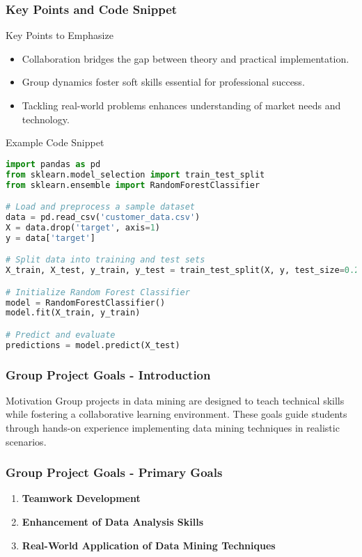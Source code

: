 \documentclass[aspectratio=169]{beamer}
\begin{document}
\begin{frame}[fragile]
    \frametitle{Key Points and Code Snippet}
    \begin{block}{Key Points to Emphasize}
        \begin{itemize}
            \item Collaboration bridges the gap between theory and practical implementation.
            \item Group dynamics foster soft skills essential for professional success.
            \item Tackling real-world problems enhances understanding of market needs and technology.
        \end{itemize}
    \end{block}
    
    \begin{block}{Example Code Snippet}
    \begin{lstlisting}[language=Python]
import pandas as pd
from sklearn.model_selection import train_test_split
from sklearn.ensemble import RandomForestClassifier

# Load and preprocess a sample dataset
data = pd.read_csv('customer_data.csv')  
X = data.drop('target', axis=1)
y = data['target']

# Split data into training and test sets
X_train, X_test, y_train, y_test = train_test_split(X, y, test_size=0.2)

# Initialize Random Forest Classifier
model = RandomForestClassifier()
model.fit(X_train, y_train)

# Predict and evaluate
predictions = model.predict(X_test)
    \end{lstlisting}
    \end{block}
\end{frame}

\begin{frame}[fragile]
    \frametitle{Group Project Goals - Introduction}
    \begin{block}{Motivation}
        Group projects in data mining are designed to teach technical skills while fostering a collaborative learning environment. These goals guide students through hands-on experience implementing data mining techniques in realistic scenarios.
    \end{block}
\end{frame}

\begin{frame}[fragile]
    \frametitle{Group Project Goals - Primary Goals}
    \begin{enumerate}
        \item \textbf{Teamwork Development}
        \item \textbf{Enhancement of Data Analysis Skills}
        \item \textbf{Real-World Application of Data Mining Techniques}
    \end{enumerate}
\end{frame}
\end{document}
